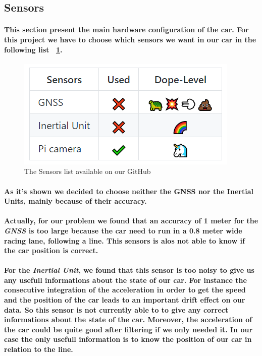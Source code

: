 \subsection{Sensors}

\paragraph{This section present the main hardware configuration of the car. 
For this project we have to choose which sensors we want in our 
car in the following list ~\ref{fig:sensors}.}

\begin{figure}[h!]
    \begin{center}
        \includegraphics[scale=0.6]{Images/Sensors.png}
    \end{center}
    \caption{The Sensors list available on our GitHub}
    \label{fig:sensors}
\end{figure}

\paragraph{As it's shown we decided to choose neither the GNSS nor the Inertial 
Units, mainly because of their accuracy. }

\paragraph{Actually, for our problem we found that an accuracy of 1 meter
for the \textit{GNSS} is too large because the car need to run in a 0.8 meter
wide racing lane, following a line. This sensors is alos not able to know if
the car position is correct.}

\paragraph{For the \textit{Inertial Unit}, we found that this sensor is too noisy to
give us any usefull informations about the state of our car. For instance the
consecutive integration of the acceleration in order to get the speed and the
position of the car leads to an important drift effect on our data. So this
sensor is not currently able to to give any correct informations about the state
of the car. Moreover, the acceleration of the car could be quite good after filtering
if we only needed it. In our case the only usefull information is to know the
position of our car in relation to the line.
}


